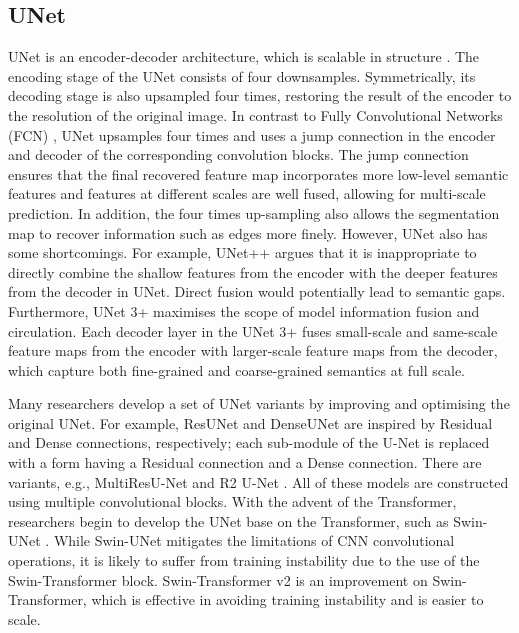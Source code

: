 \documentclass{article}
\begin{document}
\subsection{UNet}
UNet is an encoder-decoder architecture, which is scalable in structure \cite{Ronneberger2015UNetCN}. The encoding stage of the UNet consists of four downsamples. Symmetrically, its decoding stage is also upsampled four times, restoring the result of the encoder to the resolution of the original image. In contrast to Fully Convolutional Networks (FCN) \cite{Shelhamer2015FullyCN}, UNet upsamples four times and uses a jump connection in the encoder and decoder of the corresponding convolution blocks. The jump connection ensures that the final recovered feature map incorporates more low-level semantic features and features at different scales are well fused, allowing for multi-scale prediction. In addition, the four times up-sampling also allows the segmentation map to recover information such as edges more finely. However, UNet also has some shortcomings. For example, UNet++ \cite{Zhou2018UNetAN, Zhou2020UNetRS} argues that it is inappropriate to directly combine the shallow features from the encoder with the deeper features from the decoder in UNet. Direct fusion would potentially lead to semantic gaps. Furthermore, UNet 3+ \cite{Huang2020UNet3A} maximises the scope of model information fusion and circulation. Each decoder layer in the UNet 3+ fuses small-scale and same-scale feature maps from the encoder with larger-scale feature maps from the decoder, which capture both fine-grained and coarse-grained semantics at full scale.

Many researchers develop a set of UNet variants by improving and optimising the original UNet. For example, ResUNet \cite{Zhang2018RoadEB} and DenseUNet \cite{Cai2020DenseUNetAN} are inspired by Residual and Dense connections, respectively; each sub-module of the U-Net is replaced with a form having a Residual connection and a Dense connection. There are variants, e.g., MultiResU-Net \cite{Ibtehaz2020MultiResUNetR} and R2 U-Net \cite{Alom2018RecurrentRC}. All of these models are constructed using multiple convolutional blocks. With the advent of the Transformer, researchers begin to develop the UNet base on the Transformer, such as Swin-UNet \cite{Cao2021SwinUnetUP}. While Swin-UNet mitigates the limitations of CNN convolutional operations, it is likely to suffer from training instability due to the use of the Swin-Transformer block. Swin-Transformer v2 \cite{Liu2022SwinTV} is an improvement on Swin-Transformer, which is effective in avoiding training instability and is easier to scale. 
\end{document}
